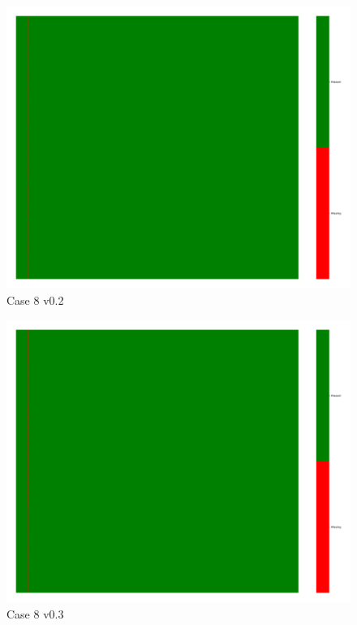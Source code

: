 \documentclass[a4paper,12pt]{article}
\begin{document}
\begin{figure}[H]
    \includegraphics[width=\linewidth]{case9_v0.2_heatmap_cleaned.png}
    \caption*{Case 8 v0.2}
\end{figure}

\begin{figure}[H]
    \includegraphics[width=\linewidth]{case9_v0.3_heatmap_cleaned.png}
    \caption*{Case 8 v0.3}
\end{figure}
\end{document}
